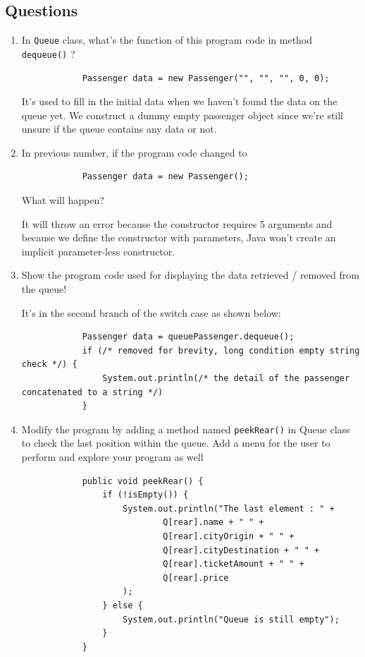 \documentclass[12pt,titlepage]{article}
\begin{document}
\subsection*{Questions}
\begin{enumerate}
    \item {
        In \texttt{Queue} class, what's the function of this program code in method \texttt{dequeue()} ?

        \begin{verbatim}
            Passenger data = new Passenger("", "", "", 0, 0);
        \end{verbatim}

        It's used to fill in the initial data when we haven't found the data on the queue yet. We construct
        a dummy empty passenger object since we're still unsure if the queue contains any data or not.
    }
    \item {
        In previous number, if the program code changed to

        \begin{verbatim}
            Passenger data = new Passenger();
        \end{verbatim}

        What will happen?

        It will throw an error because the constructor requires 5 arguments and because we define the constructor with parameters,
        Java won't create an implicit parameter-less constructor.
    }
    \item {
        Show the program code used for displaying the data retrieved / removed from the queue!

        It's in the second branch of the switch case as shown below:

        \begin{verbatim}
            Passenger data = queuePassenger.dequeue();
            if (/* removed for brevity, long condition empty string check */) {
                System.out.println(/* the detail of the passenger concatenated to a string */)
            }
        \end{verbatim}
    }
    \item {
        Modify the program by adding a method named \texttt{peekRear()} in Queue class to check the
        last position within the queue. Add a menu for the user to perform and explore your program as well

        \begin{verbatim}
            public void peekRear() {
                if (!isEmpty()) {
                    System.out.println("The last element : " +
                            Q[rear].name + " " +
                            Q[rear].cityOrigin + " " +
                            Q[rear].cityDestination + " " +
                            Q[rear].ticketAmount + " " +
                            Q[rear].price
                    );
                } else {
                    System.out.println("Queue is still empty");
                }
            }
        \end{verbatim}

}
\end{enumerate}
\end{document}
